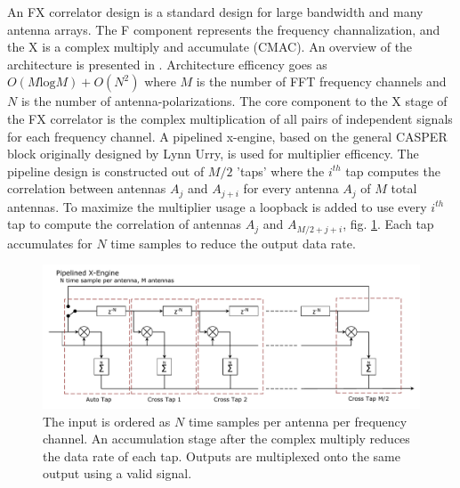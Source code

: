 \documentclass[useAMS,macros,usenatbib,onecolumn]{mn2e}
\begin{document}
An FX correlator design is a standard design for large bandwidth and many antenna arrays.
The F component represents the frequency channalization, and the X is a complex multiply and accumulate (CMAC).
An overview of the architecture is presented in \citep{}.
Architecture efficency goes as $O( M \textrm{log} M) + O( N^2)$ where $M$ is the number of FFT frequency channels and $N$ is the number of antenna-polarizations.
The core component to the X stage of the FX correlator is the complex multiplication of all pairs of independent signals for each frequency channel.
A pipelined x-engine, based on the general CASPER block originally designed by Lynn Urry\citep{}, is used for multiplier efficency.
The pipeline design is constructed out of $M/2$ 'taps' where the $i^{th}$ tap computes the correlation between antennas $A_j$ and $A_{j+i}$ for every antenna $A_j$ of $M$ total antennas.
To maximize the multiplier usage a loopback is added to use every $i^{th}$ tap to compute the correlation of antennas $A_j$ and $A_{M/2+j+i}$, fig. \ref{fig:xeng_pipe}.
Each tap accumulates for $N$ time samples to reduce the output data rate.

\begin{figure}
    \centering
    \includegraphics[scale=0.6]{graphics/crop_pipelined_xeng.pdf}
    \caption{The input is ordered as $N$ time samples per antenna per frequency channel. An accumulation stage after the complex multiply reduces the data rate of each tap. Outputs are multiplexed onto the same output using a valid signal.}
    \label{fig:xeng_pipe}
\end{figure}
\end{document}
